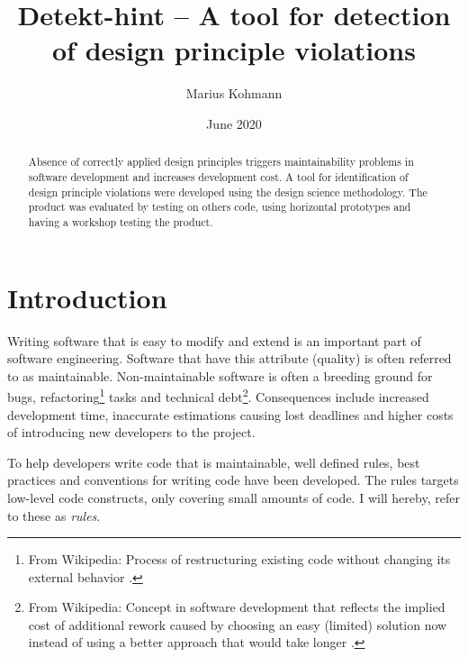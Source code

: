 \documentclass{report}
\title{Detekt-hint -- A tool for detection of design principle violations}
\author{Marius Kohmann}
\date{June 2020}
\begin{document}
\maketitle

\begin{abstract}
	Absence of correctly applied design principles triggers maintainability problems in software development and increases development cost. A tool for identification of design principle violations were developed using the design science methodology. The product was evaluated by testing on others code, using horizontal prototypes and having a workshop testing the product. 
	
	
	
\end{abstract}


\clearpage
\tableofcontents
\clearpage
\chapter{Introduction}




Writing software that is easy to modify and extend is an important part of software engineering. Software that have this attribute (quality) is often referred to as maintainable. Non-maintainable software is often a breeding ground for bugs, refactoring\footnote{From Wikipedia: Process of restructuring existing code without changing its external behavior \cite{refactoring}.} tasks and technical debt\footnote{From Wikipedia: Concept in software development that reflects the implied cost of additional rework caused by choosing an easy (limited) solution now instead of using a better approach that would take longer \cite{technicalDebt}.}. Consequences include increased development time, inaccurate estimations causing lost deadlines and higher costs of introducing new developers to the project.

To help developers write code that is maintainable, well defined rules, best practices and conventions for writing code have been developed. The rules targets low-level code constructs, only covering small amounts of code. I will hereby, refer to these as \textit{rules}.
\end{document}
